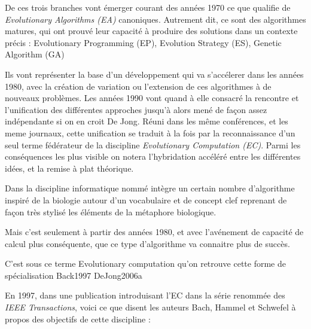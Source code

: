 De ces trois branches vont émerger courant des années 1970 ce que \textcite{DeJong2006a} qualifie de \textit{Evolutionary Algorithms (EA)} canoniques. Autrement dit, ce sont des algorithmes matures, qui ont prouvé leur capacité à produire des solutions dans un contexte précis : Evolutionary Programming (EP), Evolution Strategy (ES), Genetic Algorithm (GA)

Ils vont représenter la base d'un développement qui va s'accélerer dans les années 1980, avec la création de variation ou l'extension de ces algorithmes à de nouveaux problèmes. Les années 1990 vont quand à elle consacré la rencontre et l'unification des différentes approches jusqu'à alors mené de façon assez indépendante si on en croit De Jong.  Réuni dans les même conférences, et les meme journaux, cette unification se traduit à la fois par la reconnaissance d'un seul terme fédérateur de la discipline \textit{Evolutionary Computation (EC)}. Parmi les conséquences les plus visible on notera l'hybridation accéléré entre les différentes idées, et la remise à plat théorique. \autocite[23-31]{DeJong2006a} 

Dans la discipline informatique nommé  intègre un certain nombre d'algorithme inspiré de la biologie  autour d'un vocabulaire et de concept clef reprenant de façon très stylisé les éléments de la métaphore biologique.




Mais c'est seulement à partir des années 1980, et avec l'avénement de capacité de calcul plus conséquente, que ce type d'algorithme va connaitre plus de succès. 


C'est sous ce terme Evolutionary computation qu'on retrouve cette forme de spécialisation Back1997
DeJong2006a



En 1997, dans une publication introduisant l'EC dans la série renommée des \textit{IEEE Transactions}, voici ce que disent les auteurs Bach, Hammel et Schwefel à propos des objectifs de cette discipline :

